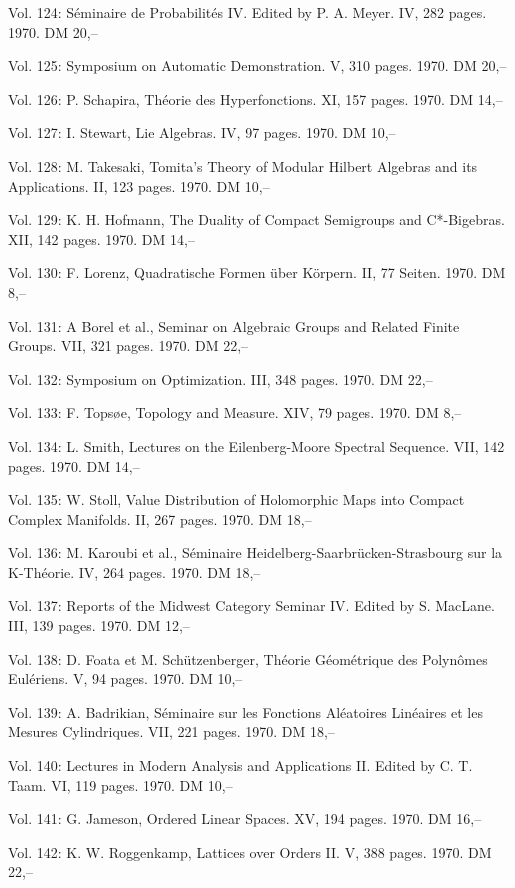 Vol. 124: Séminaire de Probabilités IV. Edited by P. A. Meyer. IV, 282 pages. 1970. DM 20,--

Vol. 125: Symposium on Automatic Demonstration. V, 310 pages. 1970. DM 20,--

Vol. 126: P. Schapira, Théorie des Hyperfonctions. XI, 157 pages. 1970. DM 14,--

Vol. 127: I. Stewart, Lie Algebras. IV, 97 pages. 1970. DM 10,--

Vol. 128: M. Takesaki, Tomita's Theory of Modular Hilbert Algebras and its Applications. II, 123 pages. 1970. DM 10,--

Vol. 129: K. H. Hofmann, The Duality of Compact Semigroups and C*-Bigebras. XII, 142 pages. 1970. DM 14,--

Vol. 130: F. Lorenz, Quadratische Formen über Körpern. II, 77 Seiten. 1970. DM 8,--

Vol. 131: A Borel et al., Seminar on Algebraic Groups and Related Finite Groups. VII, 321 pages. 1970. DM 22,--

Vol. 132: Symposium on Optimization. III, 348 pages. 1970. DM 22,--

Vol. 133: F. Topsøe, Topology and Measure. XIV, 79 pages. 1970. DM 8,--

Vol. 134: L. Smith, Lectures on the Eilenberg-Moore Spectral Sequence. VII, 142 pages. 1970. DM 14,--

Vol. 135: W. Stoll, Value Distribution of Holomorphic Maps into Compact Complex Manifolds. II, 267 pages. 1970. DM 18,--

Vol. 136: M. Karoubi et al., Séminaire Heidelberg-Saarbrücken-Strasbourg sur la K-Théorie. IV, 264 pages. 1970. DM 18,--

Vol. 137: Reports of the Midwest Category Seminar IV. Edited by S. MacLane. III, 139 pages. 1970. DM 12,--

Vol. 138: D. Foata et M. Schützenberger, Théorie Géométrique des Polynômes Eulériens. V, 94 pages. 1970. DM 10,--

Vol. 139: A. Badrikian, Séminaire sur les Fonctions Aléatoires Linéaires et les Mesures Cylindriques. VII, 221 pages. 1970. DM 18,--

Vol. 140: Lectures in Modern Analysis and Applications II. Edited by C. T. Taam. VI, 119 pages. 1970. DM 10,--

Vol. 141: G. Jameson, Ordered Linear Spaces. XV, 194 pages. 1970. DM 16,--

Vol. 142: K. W. Roggenkamp, Lattices over Orders II. V, 388 pages. 1970. DM 22,--

